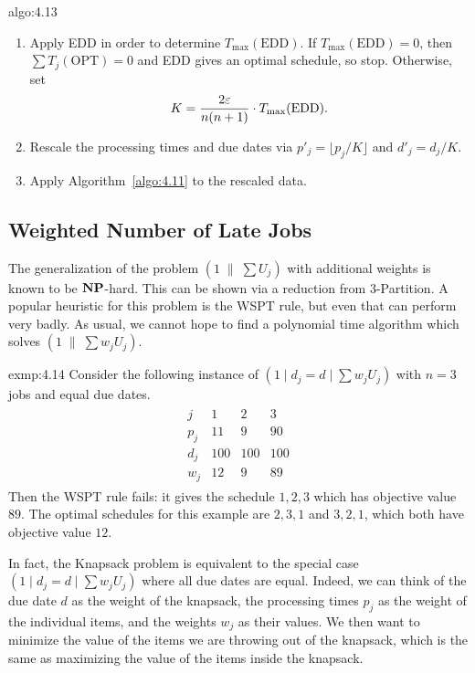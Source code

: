 \begin{algo}{algo:4.13}
    \begin{enumerate}[(1)]
        \item Apply EDD in order to determine $T_{\max}(\text{EDD})$. 
        If $T_{\max}(\text{EDD}) = 0$, then $\sum T_j(\text{OPT}) = 0$ 
        and EDD gives an optimal schedule, so stop. Otherwise, set 
        \[ K = \frac{2\varepsilon}{n(n+1)} \cdot T_{\max}(\text{EDD}). \] 
        \item Rescale the processing times and due dates via 
        $p'_j = \lfloor p_j/K \rfloor$ and $d'_j = d_j/K$. 
        \item Apply Algorithm~\ref{algo:4.11} to the rescaled data. 
    \end{enumerate}
\end{algo}

\subsection{Weighted Number of Late Jobs} \label{subsec:4.4}
The generalization of the problem $(1\;\|\;\sum U_j)$ with additional weights 
is known to be $\operatorname{\textbf{NP}}$-hard. This can be shown via a reduction from 
{\sc $3$-Partition}. A popular heuristic for this problem is the WSPT rule, 
but even that can perform very badly. As usual, we cannot hope to find a 
polynomial time algorithm which solves $(1\;\|\;\sum w_j U_j)$. 

\begin{exmp}{exmp:4.14}
    Consider the following instance of $(1 \mid d_j = d \mid \sum w_j U_j)$ with 
    $n = 3$ jobs and equal due dates. 
    \begin{align*}
        \begin{array}{c|ccc}
            j & 1 & 2 & 3 \\ \hline 
            p_j & 11 & 9 & 90 \\ 
            d_j & 100 & 100 & 100 \\ 
            w_j & 12 & 9 & 89
        \end{array}
    \end{align*}
    Then the WSPT rule fails: it gives the schedule $1, 2, 3$ which has 
    objective value $89$. The optimal schedules for this example are 
    $2, 3, 1$ and $3, 2, 1$, which both have objective value $12$. 
\end{exmp}

In fact, the {\sc Knapsack} problem is equivalent to the special case 
$(1 \mid d_j = d \mid \sum w_j U_j)$ where all due dates are equal. 
Indeed, we can think of the due date $d$ as the weight of the knapsack, 
the processing times $p_j$ as the weight of the individual items, 
and the weights $w_j$ as their values. We then want to minimize the value 
of the items we are throwing out of the knapsack, which is the same 
as maximizing the value of the items inside the knapsack. 

